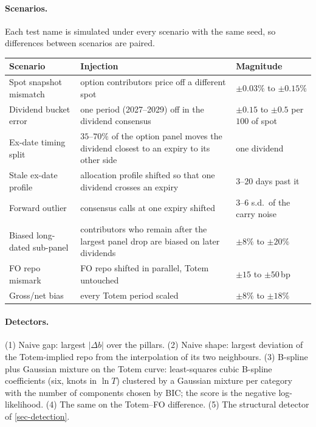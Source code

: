 \paragraph{Scenarios.} Each test name is simulated under every scenario with the same seed, so differences between
scenarios are paired.
\begin{center}\small
\begin{tabular}{p{4.0cm}p{7.4cm}p{3.2cm}}
\toprule
Scenario & Injection & Magnitude\\
\midrule
Spot snapshot mismatch & option contributors price off a different spot & $\pm0.03\%$ to $\pm0.15\%$\\
Dividend bucket error & one period (2027--2029) off in the dividend consensus & $\pm0.15$ to $\pm0.5$ per $100$ of spot\\
Ex-date timing split & $35$--$70\%$ of the option panel moves the dividend closest to an expiry to its other side & one dividend\\
Stale ex-date profile & allocation profile shifted so that one dividend crosses an expiry & $3$--$20$ days past it\\
Forward outlier & consensus calls at one expiry shifted & $3$--$6$ s.d.\ of the carry noise\\
Biased long-dated sub-panel & contributors who remain after the largest panel drop are biased on later dividends & $\pm8\%$ to $\pm20\%$\\
FO repo mismark & FO repo shifted in parallel, Totem untouched & $\pm15$ to $\pm50$\,bp\\
Gross/net bias & every Totem period scaled & $\pm8\%$ to $\pm18\%$\\
\bottomrule
\end{tabular}
\end{center}

\paragraph{Detectors.} (1) Naive gap: largest $|\Delta b|$ over the pillars. (2) Naive shape: largest deviation of the
Totem-implied repo from the interpolation of its two neighbours. (3) B-spline plus Gaussian mixture on the Totem curve:
least-squares cubic B-spline coefficients (six, knots in $\ln T$) clustered by a Gaussian mixture per category with the
number of components chosen by BIC; the score is the negative log-likelihood. (4) The same on the Totem--FO
difference. (5) The structural detector of \cref{sec-detection}.

